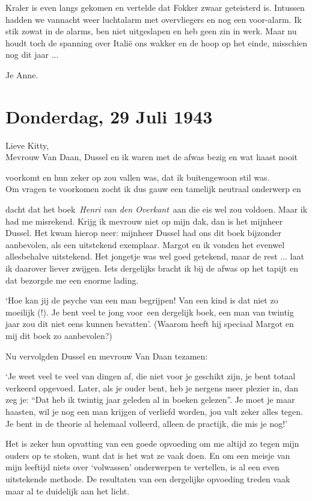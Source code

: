 \documentclass{book}
\begin{document}
Kraler is even langs gekomen en vertelde dat Fokker zwaar geteisterd is.
Intussen hadden we vannacht weer luchtalarm met overvliegers en nog een
voor-alarm. Ik stik zowat in de alarms, ben niet uitgeslapen en heb geen
zin in werk. Maar nu houdt toch de spanning over Italië ons wakker en de
hoop op het einde, misschien nog dit jaar ...

Je Anne.

\chapter{Donderdag, 29 Juli 1943}

Lieve Kitty,\\Mevrouw Van Daan, Dussel en ik waren met de afwas bezig en
wat haast nooit

voorkomt en hun zeker op zou vallen was, dat ik buitengewoon stil
was.\\Om vragen te voorkomen zocht ik dus gauw een tamelijk neutraal
onderwerp en

dacht dat het boek~\emph{Henri van den Overkant}~aan die eis wel zou
voldoen. Maar ik had me misrekend. Krijg ik mevrouw niet op mijn dak,
dan is het mijnheer Dussel. Het kwam hierop neer: mijnheer Dussel had
ons dit boek bijzonder aanbevolen, als een uitstekend exemplaar. Margot
en ik vonden het evenwel allesbehalve uitstekend. Het jongetje was wel
goed getekend, maar de rest ... laat ik daarover liever zwijgen. Iets
dergelijks bracht ik bij de afwas op het tapijt en dat bezorgde me een
enorme lading.

`Hoe kan jij de psyche van een man begrijpen! Van een kind is dat niet
zo moeilijk (!). Je bent veel te jong voor~een dergelijk boek, een man
van twintig jaar zou dit niet eens kunnen bevatten'. (Waarom heeft hij
speciaal Margot en mij dit boek zo aanbevolen?)

Nu vervolgden Dussel en mevrouw Van Daan tezamen:

`Je weet veel te veel van dingen af, die niet voor je geschikt zijn, je
bent totaal verkeerd opgevoed. Later, als je ouder bent, heb je nergens
meer plezier in, dan zeg je: ``Dat heb ik twintig jaar geleden al in
boeken gelezen''. Je moet je maar haasten, wil je nog een man krijgen of
verliefd worden, jou valt zeker alles tegen. Je bent in de theorie al
helemaal volleerd, alleen de practijk, die mis je nog!'

Het is zeker hun opvatting van een goede opvoeding om me altijd zo tegen
mijn ouders op te stoken, want dat is het wat ze vaak doen. En om een
meisje van mijn leeftijd niets over `volwassen' onderwerpen te
vertellen, is al een even uitstekende methode. De resultaten van een
dergelijke opvoeding treden vaak maar al te duidelijk aan het licht.
\end{document}

